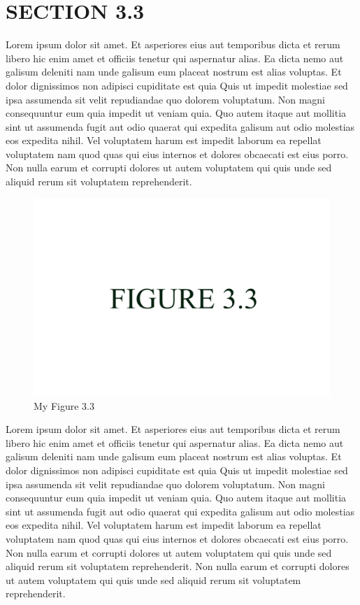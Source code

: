 \documentclass[a4paper,12pt]{report}
\begin{document}
\section{SECTION 3.3}
\hspace{.5cm}Lorem ipsum dolor sit amet. Et asperiores eius aut temporibus dicta et rerum libero hic enim amet et officiis tenetur qui aspernatur alias. Ea dicta nemo aut galisum deleniti nam unde galisum eum placeat nostrum est alias voluptas. Et dolor dignissimos non adipisci cupiditate est quia Quis ut impedit molestiae sed ipsa assumenda sit velit repudiandae quo dolorem voluptatum. Non magni consequuntur eum quia impedit ut veniam quia. Quo autem itaque aut mollitia sint ut assumenda fugit aut odio quaerat qui expedita galisum aut odio molestias eos expedita nihil. Vel voluptatem harum est impedit laborum ea repellat voluptatem nam quod quas qui eius internos et dolores obcaecati est eius porro. Non nulla earum et corrupti dolores ut autem voluptatem qui quis unde sed aliquid rerum sit voluptatem reprehenderit.
\begin{figure}
        \centering
        \includegraphics[width=12cm]{fig_3.3.jpg}
        \caption{My Figure 3.3}
        \label{fig:my_label}
\end{figure}
\par Lorem ipsum dolor sit amet. Et asperiores eius aut temporibus dicta et rerum libero hic enim amet et officiis tenetur qui aspernatur alias. Ea dicta nemo aut galisum deleniti nam unde galisum eum placeat nostrum est alias voluptas. Et dolor dignissimos non adipisci cupiditate est quia Quis ut impedit molestiae sed ipsa assumenda sit velit repudiandae quo dolorem voluptatum. Non magni consequuntur eum quia impedit ut veniam quia. Quo autem itaque aut mollitia sint ut assumenda fugit aut odio quaerat qui expedita galisum aut odio molestias eos expedita nihil. Vel voluptatem harum est impedit laborum ea repellat voluptatem nam quod quas qui eius internos et dolores obcaecati est eius porro. Non nulla earum et corrupti dolores ut autem voluptatem qui quis unde sed aliquid rerum sit voluptatem reprehenderit. Non nulla earum et corrupti dolores ut autem voluptatem qui quis unde sed aliquid rerum sit voluptatem reprehenderit.
\par
\end{document}
